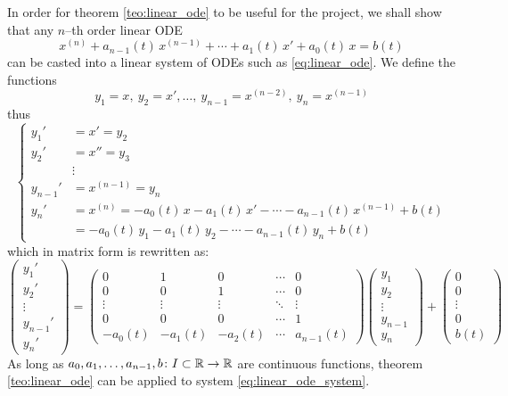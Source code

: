 In order for theorem \ref{teo:linear_ode} to be useful for the project, we
shall show that any $n$--th order linear ODE
\begin{equation}
	x^{(n)} + a_{n-1}(t) \, x^{(n-1)} + \cdots + a_1(t) \, x' + a_0(t) \, x = b(t) 
\end{equation}
can be casted into a linear system of ODEs such as \eqref{eq:linear_ode}. We
define the functions
\begin{equation}
	y_1 = x, \ y_2 = x', \ldots, \ y_{n-1} = x^{(n-2)}, \ y_n = x^{(n-1)}
\end{equation}
thus
\begin{equation}
	\left\{
		\begin{aligned}
			y_1' &= x' = y_2 \\
			y_2' &= x'' = y_3 \\
			&\vdots \\
			y_{n-1}' &= x^{(n-1)} = y_n \\
			y_n' &= x^{(n)} = -a_0(t) \, x - a_1(t) \, x' - \cdots - a_{n-1}(t) \, x^{(n-1)} + b(t) \\
			&= -a_0(t) \, y_1 - a_1(t) \, y_2 - \cdots - a_{n-1}(t) \, y_n + b(t)
		\end{aligned}
	\right.
\end{equation}
which in matrix form is rewritten as:
\begin{equation} \label{eq:linear_ode_system}
	\begin{pmatrix}
		y_1' \\ y_2' \\ \vdots \\ y_{n-1}' \\ y_n'
	\end{pmatrix} = 
	\begin{pmatrix}
		0 & 1 & 0 & \cdots & 0 \\
		0 & 0 & 1 & \cdots & 0 \\
		\vdots & \vdots & \vdots & \ddots & \vdots \\
		0 & 0 & 0 & \cdots & 1 \\
		-a_0(t) & -a_1(t) & -a_2(t) & \cdots & a_{n-1}(t)
	\end{pmatrix}
	\begin{pmatrix}
		y_1 \\ y_2 \\ \vdots \\ y_{n-1} \\ y_n
	\end{pmatrix} + 
	\begin{pmatrix}
		0 \\ 0 \\ \vdots \\ 0 \\ b(t)
	\end{pmatrix}
\end{equation}
As long as $a_0, a_1, \ldots, a_{n-1}, b \colon I \subset \mathbb{R} \to \mathbb{R}$ are
continuous functions, theorem \ref{teo:linear_ode} can be applied to system
\eqref{eq:linear_ode_system}.


